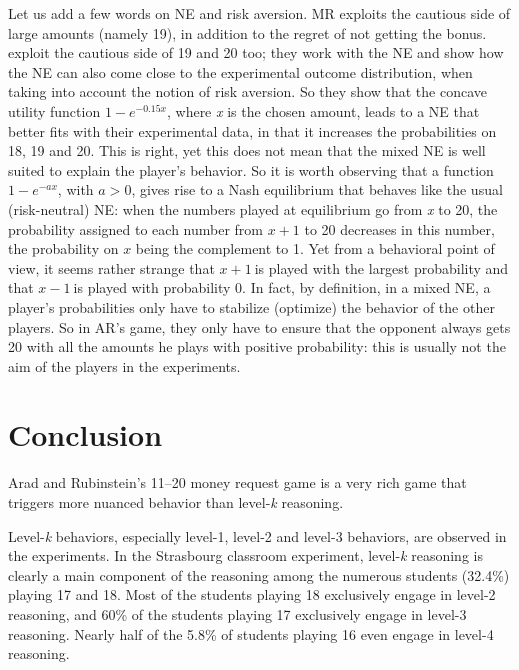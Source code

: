 \begin{Article}
\begin{refsection}[Umbhauer]
Let us add a few words on NE and risk aversion. MR exploits the cautious
side of large amounts (namely 19), in addition to the regret of not
getting the bonus. \textcite{li2018} exploit the cautious side of 19
and 20 too; they work with the NE and show how the NE can also come
close to the experimental outcome distribution, when taking into account
the notion of risk aversion. So they show that the concave utility
function \(1 - e^{- 0.15x}\), where \emph{x} is the chosen amount, leads
to a NE that better fits with their experimental data, in that it
increases the probabilities on 18, 19 and 20. This is right, yet this
does not mean that the mixed NE is well suited to explain the player's
behavior. So it is worth observing that a function \(1 - e^{- ax}\),
with \(a > 0\), gives rise to a Nash equilibrium that behaves like the
usual (risk-neutral) NE: when the numbers played at equilibrium go from
\emph{x} to 20, the probability assigned to each number from \(x + 1\)
to 20 decreases in this number, the probability on \(x\) being the
complement to 1. Yet from a behavioral point of view, it seems rather
strange that \(x + 1\ \)is played with the largest probability and that
\(x - 1\ \)is played with probability 0. In fact, by definition, in a
mixed NE, a player's probabilities only have to stabilize (optimize) the
behavior of the other players. So in AR's game, they only have to ensure
that the opponent always gets 20 with all the amounts he plays with
positive probability: this is usually not the aim of the players in the
experiments.


\section{Conclusion}
\label{section:Conclusion_Umbhauer_en}

Arad and Rubinstein's 11--20 money request game is a very rich game that
triggers more nuanced behavior than level-\emph{k} reasoning.

Level-\emph{k} behaviors, especially level-1, level-2 and level-3
behaviors, are observed in the experiments. In the Strasbourg classroom
experiment, level-\emph{k} reasoning is clearly a main component of the
reasoning among the numerous students (32.4\%) playing 17 and 18. Most
of the students playing 18 exclusively engage in level-2 reasoning, and
60\% of the students playing 17 exclusively engage in level-3 reasoning.
Nearly half of the 5.8\% of students playing 16 even engage in level-4
reasoning.


\end{refsection}
\end{Article}
